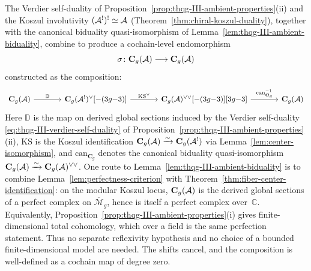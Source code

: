 \begin{construction}
\label{constr:thqg-III-verdier-involution}
The Verdier self-duality of
Proposition~\ref{prop:thqg-III-ambient-properties}(ii) and
the Koszul involutivity
$(\mathcal{A}^!)^! \simeq \mathcal{A}$
(Theorem~\ref{thm:chiral-koszul-duality}), together with the
canonical biduality quasi-isomorphism of
Lemma~\ref{lem:thqg-III-ambient-biduality}, combine to produce
a cochain-level endomorphism
\begin{equation}\label{eq:thqg-III-sigma-def}
\sigma
\colon
\mathbf{C}_g(\mathcal{A}) \longrightarrow \mathbf{C}_g(\mathcal{A})
\end{equation}
constructed as the composition:
\begin{equation}\label{eq:thqg-III-sigma-composition}
\begin{tikzcd}[column sep=large]
\mathbf{C}_g(\cA)
\arrow[r, "\mathbb{D}"]
&
\mathbf{C}_g(\cA^!)^{\vee}[{-(3g{-}3)}]
\arrow[r, "\mathrm{KS}^{\vee}"]
&
\mathbf{C}_g(\cA)^{\vee\vee}[{-(3g{-}3)}][{3g{-}3}]
\arrow[r, "\mathrm{can}_{\mathbf{C}_g}^{-1}"]
&
\mathbf{C}_g(\cA)
\end{tikzcd}
\end{equation}
Here $\mathbb{D}$ is the map on derived global sections induced by the
Verdier self-duality
\eqref{eq:thqg-III-verdier-self-duality} of
Proposition~\ref{prop:thqg-III-ambient-properties}(ii),
$\mathrm{KS}$ is the Koszul identification
$\mathbf{C}_g(\mathcal{A}) \xrightarrow{\sim} \mathbf{C}_g(\mathcal{A}^!)$
via Lemma~\ref{lem:center-isomorphism}, and
$\mathrm{can}_{\mathbf{C}_g}$ denotes the canonical biduality
quasi-isomorphism
$\mathbf{C}_g(\mathcal{A}) \xrightarrow{\sim} \mathbf{C}_g(\mathcal{A})^{\vee\vee}$.
One route to Lemma~\ref{lem:thqg-III-ambient-biduality} is to combine
Lemma~\ref{lem:perfectness-criterion} with
Theorem~\ref{thm:fiber-center-identification}: on the modular
Koszul locus, $\mathbf{C}_g(\mathcal{A})$ is the derived global sections of
a perfect complex on $\overline{\mathcal{M}}_g$, hence is itself a
perfect complex over~$\mathbb{C}$. Equivalently,
Proposition~\ref{prop:thqg-III-ambient-properties}(i) gives
finite-dimensional total cohomology, which over a field is the same
perfection statement. Thus no separate reflexivity hypothesis and no
choice of a bounded finite-dimensional model are needed.
The shifts cancel, and the composition
is well-defined as a cochain map of degree zero.
\end{construction}

